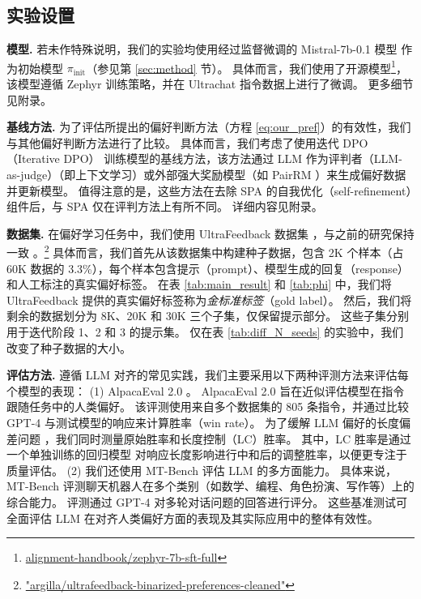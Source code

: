\subsection{实验设置} \label{sec:5.1}

\textbf{模型.}  
若未作特殊说明，我们的实验均使用经过监督微调的 Mistral-7b-0.1 模型 \citep{jiang2023mistral} 作为初始模型 $\pi_{\text{init}}$（参见第 \ref{sec:method} 节）。  
具体而言，我们使用了开源模型\footnote{\url{alignment-handbook/zephyr-7b-sft-full}}，该模型遵循 Zephyr \citep{tunstall2023zephyr} 训练策略，并在 Ultrachat \citep{ding2023enhancing} 指令数据上进行了微调。  
更多细节见附录。

\textbf{基线方法.}  
为了评估所提出的偏好判断方法（方程 \ref{eq:our_pref}）的有效性，我们与其他偏好判断方法进行了比较。  
具体而言，我们考虑了使用迭代 DPO（Iterative DPO）\citep{snorkel2024pairrm, xu2023some} 训练模型的基线方法，该方法通过 LLM 作为评判者（LLM-as-judge）\citep{bai2022constitutional, zheng2023judging}（即上下文学习）或外部强大奖励模型（如 PairRM \citep{jiang2023llm}）来生成偏好数据并更新模型。  
值得注意的是，这些方法在去除 SPA 的自我优化（self-refinement）组件后，与 SPA 仅在评判方法上有所不同。  
详细内容见附录。

\textbf{数据集.}  
在偏好学习任务中，我们使用 UltraFeedback 数据集 \citep{cui2023ultrafeedback}，与之前的研究保持一致 \citep{snorkel2024pairrm, rosset2024direct}。\footnote{\url{"argilla/ultrafeedback-binarized-preferences-cleaned"}}  
具体而言，我们首先从该数据集中构建种子数据，包含 2K 个样本（占 60K 数据的 3.3\%），每个样本包含提示（prompt）、模型生成的回复（response）和人工标注的真实偏好标签。  
在表 \ref{tab:main_result} 和 \ref{tab:phi} 中，我们将 UltraFeedback 提供的真实偏好标签称为\textit{金标准标签}（gold label）。  
然后，我们将剩余的数据划分为 8K、20K 和 30K 三个子集，仅保留提示部分。  
这些子集分别用于迭代阶段 1、2 和 3 的提示集。  
仅在表 \ref{tab:diff_N_seeds} 的实验中，我们改变了种子数据的大小。  

\textbf{评估方法.}  
遵循 LLM 对齐的常见实践，我们主要采用以下两种评测方法来评估每个模型的表现：  
(1) AlpacaEval 2.0 \citep{dubois2023alpacafarm, dubois2024length, alpaca_eval}。  
AlpacaEval 2.0 旨在近似评估模型在指令跟随任务中的人类偏好。  
该评测使用来自多个数据集的 805 条指令，并通过比较 GPT-4 \citep{openai2023gpt4} 与测试模型的响应来计算胜率（win rate）。  
为了缓解 LLM 偏好的长度偏差问题 \citep{wang2023far, zheng2023judging}，我们同时测量原始胜率和长度控制（LC）胜率。  
其中，LC 胜率是通过一个单独训练的回归模型 \citep{dubois2024length} 对响应长度影响进行中和后的调整胜率，以便更专注于质量评估。  
(2) 我们还使用 MT-Bench \citep{zheng2023judging} 评估 LLM 的多方面能力。  
具体来说，MT-Bench 评测聊天机器人在多个类别（如数学、编程、角色扮演、写作等）上的综合能力。  
评测通过 GPT-4 对多轮对话问题的回答进行评分。  
这些基准测试可全面评估 LLM 在对齐人类偏好方面的表现及其实际应用中的整体有效性。  


